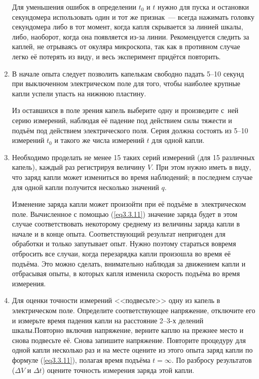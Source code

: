 \begin{enumerate}
{Для уменьшения ошибок в определении $t_0$ и $t$ нужно для пуска и остановки секундомера использовать один и тот же признак~--- всегда нажимать головку секундомера либо в тот момент, когда капля скрывается за линией шкалы, либо, наоборот, когда она появляется из-за линии. Рекомендуется следить за каплей, не отрываясь от окуляра микроскопа, так как в противном случае легко её потерять из виду, и весь эксперимент придётся повторить.}

\item{ В начале опыта следует позволить капелькам свободно падать \mbox{5--10} секунд при выключенном электрическом поле для того, чтобы наиболее крупные капли успели упасть на нижнюю пластину.

Из оставшихся в поле зрения капель выберите одну и произведите с~ней серию измерений, наблюдая её падение под действием силы тяжести и подъём под действием электрического поля. Серия должна состоять из 5--10 измерений $t_0$ и такого же числа измерений $t$ для одной капли.}

\item{ Необходимо проделать не менее 15 таких серий измерений (для 15 различных капель), каждый раз регистрируя величину $V$. При этом нужно иметь в виду, что заряд капли может измениться во время наблюдений; в последнем случае для одной капли получится несколько значений $q$.

Изменение заряда капли может произойти при её подъёме в~электрическом поле. Вычисленное с помощью (\ref{eq3.3.11}) значение заряда будет в этом случае соответствовать некоторому среднему из величины заряда капли в начале и в конце опыта. Соответствующий результат непригоден для обработки и только запутывает опыт. Нужно поэтому стараться вовремя отбросить все случаи, когда перезарядка капли произошла во время её подъёма. Это можно сделать, внимательно наблюдая за движением капли и отбрасывая опыты, в которых капля изменила скорость подъёма во время измерения.}

\item{ Для оценки точности измерений <<подвесьте>> одну из капель в электрическом поле. Определите соответствующее напряжение, отключите его  и измерьте время падения капли на расстояние \mbox{2--3-х} делений шкалы.Повторно включив напряжение, верните каплю на прежнее место и снова подвесьте её. Снова запишите напряжение. Повторите  процедуру  для одной капли несколько раз  и на месте  оцените из этого опыта заряд капли по формуле (\ref{eq3.3.11}), полагая время подъёма $t=\infty$. По разбросу результатов ($\Delta V$ и  $\Delta t$) оцените точность измерения заряда этой капли.}

\end{enumerate}


